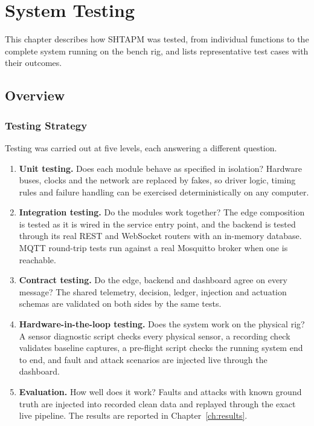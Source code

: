 \chapter{System Testing}
\label{ch:testing}

This chapter describes how SHTAPM was tested, from individual functions to the complete system running on the bench rig, and lists representative test cases with their outcomes.

\section{Overview}

\subsection{Testing Strategy}

Testing was carried out at five levels, each answering a different question.

\begin{enumerate}
  \item \textbf{Unit testing.} Does each module behave as specified in isolation? Hardware buses, clocks and the network are replaced by fakes, so driver logic, timing rules and failure handling can be exercised deterministically on any computer.
  \item \textbf{Integration testing.} Do the modules work together? The edge composition is tested as it is wired in the service entry point, and the backend is tested through its real REST and WebSocket routers with an in-memory database. MQTT round-trip tests run against a real Mosquitto broker when one is reachable.
  \item \textbf{Contract testing.} Do the edge, backend and dashboard agree on every message? The shared telemetry, decision, ledger, injection and actuation schemas are validated on both sides by the same tests.
  \item \textbf{Hardware-in-the-loop testing.} Does the system work on the physical rig? A sensor diagnostic script checks every physical sensor, a recording check validates baseline captures, a pre-flight script checks the running system end to end, and fault and attack scenarios are injected live through the dashboard.
  \item \textbf{Evaluation.} How well does it work? Faults and attacks with known ground truth are injected into recorded clean data and replayed through the exact live pipeline. The results are reported in Chapter~\ref{ch:results}.
\end{enumerate}

